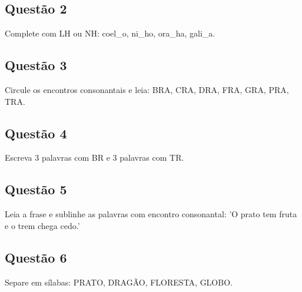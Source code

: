 \begin{center}
  \underline{\hspace{12cm}}
\end{center}

\subsection*{Questão 2}
Complete com LH ou NH: coel\_o, ni\_ho, ora\_ha, gali\_a.

\begin{center}
  \underline{\hspace{12cm}}
\end{center}

\subsection*{Questão 3}
Circule os encontros consonantais e leia: BRA, CRA, DRA, FRA, GRA, PRA, TRA.

\begin{center}
  \underline{\hspace{12cm}}
\end{center}

\subsection*{Questão 4}
Escreva 3 palavras com BR e 3 palavras com TR.

\begin{center}
  \underline{\hspace{12cm}}
\end{center}

\subsection*{Questão 5}
Leia a frase e sublinhe as palavras com encontro consonantal: 'O prato tem fruta e o trem chega cedo.'

\begin{center}
  \underline{\hspace{12cm}}
\end{center}

\subsection*{Questão 6}
Separe em sílabas: PRATO, DRAGÃO, FLORESTA, GLOBO.

\begin{center}
  \underline{\hspace{12cm}}
\end{center}

